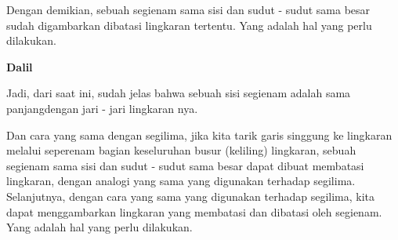 \documentclass[a4paper]{book}
\begin{document}
Dengan demikian, sebuah segienam sama sisi dan sudut - sudut sama besar sudah
digambarkan dibatasi lingkaran tertentu. Yang adalah hal yang perlu dilakukan.

\begin{center}\textbf{Dalil}\end{center}
Jadi, dari saat ini, sudah jelas bahwa sebuah sisi segienam adalah sama panjangdengan jari - jari lingkaran nya.

Dan cara yang sama dengan segilima, jika kita tarik garis singgung ke lingkaran
melalui seperenam bagian keseluruhan busur (keliling) lingkaran, sebuah 
segienam sama sisi dan sudut - sudut sama besar dapat dibuat membatasi 
lingkaran, dengan analogi yang sama yang digunakan terhadap segilima. 
Selanjutnya, dengan cara yang sama yang digunakan terhadap segilima, 
kita dapat menggambarkan 
lingkaran yang membatasi dan dibatasi oleh segienam. Yang adalah hal yang perlu
dilakukan.  
\end{document}
